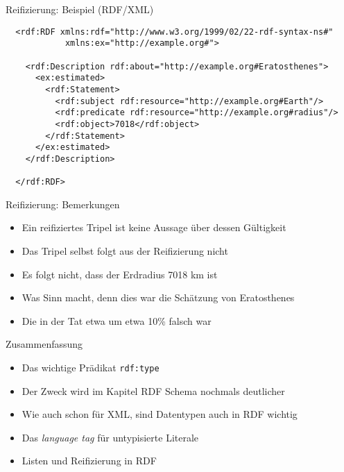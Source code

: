 \documentclass{beamer}
\begin{document}
\begin{frame}[fragile]{Reifizierung: Beispiel (RDF/XML)}
	
	\small
	\begin{lstlisting}	
  <rdf:RDF xmlns:rdf="http://www.w3.org/1999/02/22-rdf-syntax-ns#"
            xmlns:ex="http://example.org#">

    <rdf:Description rdf:about="http://example.org#Eratosthenes">
      <ex:estimated>
        <rdf:Statement>
          <rdf:subject rdf:resource="http://example.org#Earth"/>
          <rdf:predicate rdf:resource="http://example.org#radius"/>
          <rdf:object>7018</rdf:object>
        </rdf:Statement>
      </ex:estimated>
    </rdf:Description>

  </rdf:RDF>
	\end{lstlisting}
	
\end{frame}

\begin{frame}{Reifizierung: Bemerkungen}
	
	\begin{itemize}
		\item Ein reifiziertes Tripel ist keine Aussage über dessen Gültigkeit
		\item Das Tripel selbst folgt aus der Reifizierung nicht
		\item Es folgt nicht, dass der Erdradius 7018 km ist
		\item Was Sinn macht, denn dies war die Schätzung von Eratosthenes
		\item Die in der Tat etwa um etwa 10\% falsch war
	\end{itemize}
	
\end{frame}

\begin{frame}{Zusammenfassung}
	
	\begin{itemize}
		\item Das wichtige Prädikat \texttt{rdf:type}
		\item Der Zweck wird im Kapitel RDF Schema nochmals deutlicher
		\item Wie auch schon für XML, sind Datentypen auch in RDF wichtig
		\item Das \emph{language tag} für untypisierte Literale
		\item Listen und Reifizierung in RDF
	\end{itemize}
	
\end{frame}
\end{document}
